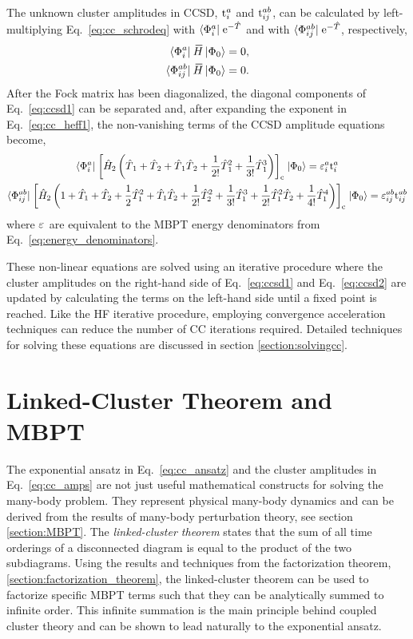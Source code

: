 \documentclass[thesis.tex]{subfiles}
\begin{document}
The unknown cluster amplitudes in CCSD, $\text{t}^{a}_{i}$ and $\text{t}^{ab}_{ij}$, can be calculated by left-multiplying Eq.\ \eqref{eq:cc_schrodeq} with $\langle \Phi^{a}_{i} |\hspace{1pt} \operatorname{e}^{-\hat{T}\hspace{-0.25pt}}$ and with $\langle \Phi^{ab}_{ij} |\hspace{1pt} \operatorname{e}^{-\hat{T}\hspace{-0.25pt}}$, respectively,
\begin{align} \label{eq:ccsd1}
  \statebra{a}{i} \EHam \refket &= 0, \notag \\
  \statebra{ab}{ij} \EHam \refket &= 0.
\end{align}
After the Fock matrix has been diagonalized, the diagonal components of Eq.\ \eqref{eq:ccsd1} can be separated and, after expanding the exponent in Eq.\ \eqref{eq:cc_heff1}, the non-vanishing terms of the CCSD amplitude equations become,
\begin{gather} \label{eq:ccsd2}
  \langle \Phi^{a}_{i} |\hspace{1pt} \left[ \hat{H}\hspace{-1pt}_{2} \left(\hat{T}\hspace{-0.25pt}_{1} + \hat{T}\hspace{-0.25pt}_{2} + \hat{T}\hspace{-0.25pt}_{1}\hat{T}\hspace{-0.25pt}_{2} + \frac{1}{2!} \hat{T}\hspace{-0.25pt}_{1}^{2} + \frac{1}{3!} \hat{T}\hspace{-0.25pt}_{1}^{3}\right) \right]_{\mathrm{c}} \hspace{1pt}\lvert \Phi_{0} \rangle = \varepsilon^{a}_{i}\text{t}^{a}_{i} \\
  \langle \Phi^{ab}_{ij} |\hspace{1pt} \left[ \hat{H}\hspace{-1pt}_{2} \left(1 + \hat{T}_1 + \hat{T}_2 + \frac{1}{2} \hat{T}_1^{2} + \hat{T}_1\hat{T}_2 + \frac{1}{2!} \hat{T}_2^{2} + \frac{1}{3!} \hat{T}_1^{3} + \frac{1}{2!} \hat{T}_1^{2} \hat{T}_2 + \frac{1}{4!} \hat{T}_1^{4}\right) \right]_{\mathrm{c}} \hspace{1pt}\lvert \Phi_{0} \rangle = \varepsilon^{ab}_{ij}\text{t}^{ab}_{ij} \notag
\end{gather}
where $\varepsilon^{}_{}$ are equivalent to the MBPT energy denominators from Eq.\ \eqref{eq:energy_denominators}.

These non-linear equations are solved using an iterative procedure where the cluster amplitudes on the right-hand side of Eq.\ \eqref{eq:ccsd1} and Eq.\ \eqref{eq:ccsd2} are updated by calculating the terms on the left-hand side until a fixed point is reached.  Like the HF iterative procedure, employing convergence acceleration techniques can reduce the number of CC iterations required.  Detailed techniques for solving these equations are discussed in section \ref{section:solvingcc}.



\section{Linked-Cluster Theorem and MBPT} \label{section:linkedcluster}

The exponential ansatz in Eq.\ \eqref{eq:cc_ansatz} and the cluster amplitudes in Eq.\ \eqref{eq:cc_amps} are not just useful mathematical constructs for solving the many-body problem. They represent physical many-body dynamics and can be derived from the results of many-body perturbation theory, see section \ref{section:MBPT}.  The \textit{linked-cluster theorem} \cite{HUGENHOLTZ1957481,FRANTZ196016,BRANDOW1967} states that the sum of all time orderings of a disconnected diagram is equal to the product of the two subdiagrams.  Using the results and techniques from the factorization theorem, \ref{section:factorization_theorem}, the linked-cluster theorem can be used to factorize specific MBPT terms such that they can be analytically summed to infinite order.  This infinite summation is the main principle behind coupled cluster theory and can be shown to lead naturally to the exponential ansatz.
\end{document}
